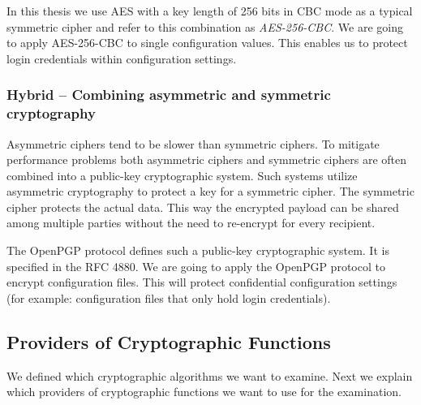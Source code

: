 In this thesis we use AES with a key length of 256 bits in CBC mode as a typical symmetric cipher and refer to this combination as \emph{AES-256-CBC}.
We are going to apply AES-256-CBC to single configuration values.
This enables us to protect login credentials within configuration settings.

\subsubsection{Hybrid -- Combining asymmetric and symmetric cryptography}

Asymmetric ciphers tend to be slower than symmetric ciphers.
To mitigate performance problems both asymmetric ciphers and symmetric ciphers are often combined into a public-key cryptographic system.
Such systems utilize asymmetric cryptography to protect a key for a symmetric cipher.
The symmetric cipher protects the actual data.
This way the encrypted payload can be shared among multiple parties without the need to re-encrypt for every recipient.\cite{stallings2014}

The OpenPGP protocol defines such a public-key cryptographic system.
It is specified in the RFC 4880.\cite{rfc4880}
We are going to apply the OpenPGP protocol to encrypt configuration files.
This will protect confidential configuration settings (for example: configuration files that only hold login credentials).

%
%

\subsection{Providers of Cryptographic Functions}
\label{intro-provider}

We defined which cryptographic algorithms we want to examine.
Next we explain which providers of cryptographic functions we want to use for the examination.

